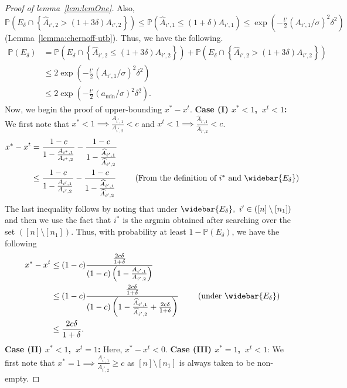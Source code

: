 \begin{proof}[Proof of lemma~\ref{lem:lemOne}]
Also, $\mathbb{P}\left(E_\delta \cap \left\{ \widehat{A}_{i', 2} >  \left(1+3\delta \right)A_{i', 2} \right\}\right) \leq  \mathbb{P}(\widehat{A}_{i', 1}\leq (1+\delta) A_{i', 1}) \leq \exp\left( -\frac{t'}{2}\left(A_{i', 1}/\sigma\right)^2\delta^2 \right)$ (Lemma~\ref{lemma:chernoff-utb}). Thus, we have the following.
\begin{align*}
    \mathbb{P}(E_\delta)&=  \mathbb{P}\left(E_\delta \cap \left\{ \widehat{A}_{i', 2} \leq  \left(1+3\delta \right)A_{i', 2} \right\}\right) + \mathbb{P}\left(E_\delta \cap \left\{ \widehat{A}_{i', 2} >  \left(1+3\delta \right)A_{i', 2} \right\}\right)\\
    &\leq  2\exp\left( -\frac{t'}{2}\left(A_{i', 1}/\sigma\right)^2\delta^2 \right)\\
    &\leq 2\exp\left( -\frac{t'}{2}\left(a_{\min}/\sigma\right)^2\delta^2 \right).
\end{align*}
Now, we begin the proof of upper-bounding $x^*-x^t$.
\newline
\textbf{Case (I) $x^*<1$,\ $x^t<1$:}
We first note that $x^*<1\implies \frac{A_{i^*, 1}}{A_{i^*, 2}}<c$ and $x^t<1\implies \frac{\widehat{A}_{i', 1}}{\widehat{A}_{i', 2}}<c$.
\begin{align*}
    x^*-x^t & = \frac{1-c}{1-\frac{A_{i^*,1}}{A_{i^*,2}}}-\frac{1-c}{1-\frac{\widehat{A}_{i',1}}{\widehat{A}_{i',2}}} \\
    &\leq \frac{1-c}{1-\frac{A_{i',1}}{A_{i',2}}}-\frac{1-c}{1-\frac{\widehat{A}_{i',1}}{\widehat{A}_{i',2}}} \ \tag{From the definition of $i^*$ and $\widebar{E_\delta}$}
\end{align*}
The last inequality follows by noting that under $\widebar{E_\delta},\ i'\in ([n]\setminus [n_1])$ and then we use the fact that $i^*$ is the argmin obtained after searching over the set $([n]\setminus [n_1])$. Thus, with probability at least $1-\mathbb{P}(E_\delta)$, we have the following
\begin{align*}
    x^*-x^t&\leq (1-c)\frac{\frac{2c\delta}{1+\delta}}{(1-c)\left(1-\frac{A_{i', 1}}{A_{i', 2}} \right)}\\
    &\leq (1-c)\frac{\frac{2c\delta}{1+\delta}}{(1-c)\left(1-\frac{\widehat{A}_{i', 1}}{\widehat{A}_{i', 2}} +\frac{2c\delta}{1+\delta} \right)} \ \tag{under $\widebar{E_\delta}$}\\
    &\leq \frac{2c\delta}{1+\delta}.
\end{align*}
\textbf{Case (II) $x^*<1$,\ $x^t=1$:} Here, $x^*-x^t<0$.
\newline
\textbf{Case (III) $x^*=1$,\ $x^t<1$}: 
We first note that $x^*=1\implies \frac{A_{i^*, 1}}{A_{i^*, 2}}\geq c$ as $[n]\setminus [n_1]$ is always taken to be non-empty. 


\end{proof}
